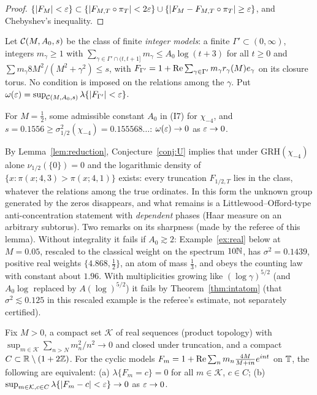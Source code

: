 \begin{proof}
$\{|F_M|<\varepsilon\}\subset\{|F_{M,T}\circ\pi_T|<2\varepsilon\}\cup\{|F_M-F_{M,T}\circ\pi_T|\ge\varepsilon\}$, and Chebyshev's inequality.
\end{proof}

Let $\mathcal C(M,A_0,s)$ be the class of finite \emph{integer models}: a finite $\Gamma'\subset(0,\infty)$, integers $m_\gamma\ge1$ with $\sum_{\gamma\in\Gamma'\cap(t,t+1]}m_\gamma\le A_0\log(t+3)$ for all $t\ge0$ and $\sum m_\gamma8M^2/(M^2+\gamma^2)\le s$, with $F_{\Gamma'}=1+\operatorname{Re}\sum_{\gamma\in\Gamma'}m_\gamma r_\gamma(M)e_\gamma$ on its closure torus. No condition is imposed on the relations among the $\gamma$. Put $\omega(\varepsilon)=\sup_{\mathcal C(M,A_0,s)}\lambda\{|F_{\Gamma'}|<\varepsilon\}$.

\begin{conjecture}[U; open]\label{conj:U}
For $M=\frac12$, some admissible constant $A_0$ in (I7) for $\chi_{-4}$, and $s=0.1556\ge\sigma_{1/2}^2(\chi_{-4})=0.155568\ldots$: $\omega(\varepsilon)\to0$ as $\varepsilon\to0$.
\end{conjecture}

By Lemma~\ref{lem:reduction}, Conjecture~\ref{conj:U} implies that under GRH$(\chi_{-4})$ alone $\nu_{1/2}(\{0\})=0$ and the logarithmic density of $\{x:\pi(x;4,3)>\pi(x;4,1)\}$ exists: every truncation $F_{1/2,T}$ lies in the class, whatever the relations among the true ordinates. In this form the unknown group generated by the zeros disappears, and what remains is a Littlewood--Offord-type anti-concentration statement with \emph{dependent} phases (Haar measure on an arbitrary subtorus). Two remarks on its sharpness (made by the referee of this lemma). Without integrality it fails if $A_0\gtrsim2$: Example~\ref{ex:real} below at $M=0.05$, rescaled to the classical weight on the spectrum $10\mathbb N$, has $\sigma^2=0.1439$, positive real weights $\{4.868,\frac12\}$, an atom of mass $\frac13$, and obeys the counting law with constant about $1.96$. With multiplicities growing like $(\log\gamma)^{5/2}$ (and $A_0\log$ replaced by $A(\log)^{5/2}$) it fails by Theorem~\ref{thm:intatom} (that $\sigma^2\lesssim0.125$ in this rescaled example is the referee's estimate, not separately certified).

\begin{lemma}\label{lem:compact}
Fix $M>0$, a compact set $\mathcal K$ of real sequences (product topology) with $\sup_{m\in\mathcal K}\sum_{n>N}m_n^2/n^2\to0$ and closed under truncation, and a compact $C\subset\mathbb R\setminus(1+2\mathbb Z)$. For the cyclic models $F_m=1+\operatorname{Re}\sum_nm_n\frac{4M}{M+in}e^{int}$ on $\mathbb T$, the following are equivalent: \textup{(a)} $\lambda\{F_m=c\}=0$ for all $m\in\mathcal K$, $c\in C$; \textup{(b)} $\sup_{m\in\mathcal K,c\in C}\lambda\{|F_m-c|<\varepsilon\}\to0$ as $\varepsilon\to0$.
\end{lemma}

